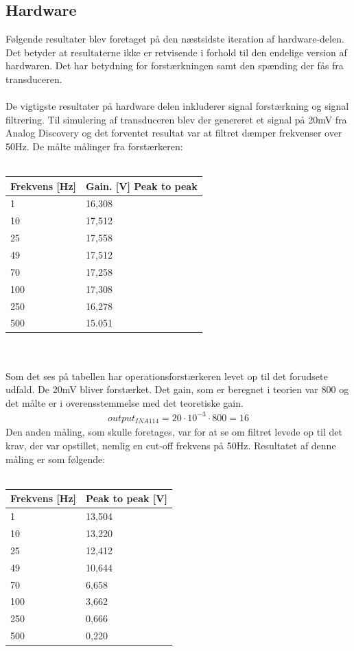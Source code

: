 \subsection{Hardware}
Følgende resultater blev foretaget på den næstsidste iteration af hardware-delen. Det betyder at resultaterne ikke er retvisende i forhold til den endelige version af hardwaren. Det har betydning for forstærkningen samt den spænding der fås fra transduceren. \\\\
De vigtigste resultater på hardware delen inkluderer signal forstærkning og signal filtrering. Til simulering af transduceren blev der genereret et signal på 20mV fra Analog Discovery og det forventet resultat var at filtret dæmper frekvenser over 50Hz. De målte målinger fra forstærkeren: 
\\\\
\begin{tabular}{| l | l |} \hline
\textbf{Frekvens [Hz]} & \textbf{Gain. [V] Peak to peak}\\\hline
1 & 16,308 \\\hline 
10 & 17,512 \\\hline
25 & 17,558 \\\hline 
49 & 17,512\\\hline
70 & 17,258\\\hline 
100 & 17,308 \\\hline
250 & 16,278\\\hline
500 & 15.051\\\hline
\end{tabular}\\\\
Som det ses på tabellen har operationsforstærkeren levet op til det forudsete udfald. De 20mV bliver forstærket. Det gain, som er beregnet i teorien var 800 og det målte er i overensstemmelse med det teoretiske gain.  
\begin{align}
output_{INA114}=20\cdot 10^{-3}\cdot 800=16
\end{align}
Den anden måling, som skulle foretages, var for at se om filtret levede op til det krav, der var opstillet, nemlig en cut-off frekvens på 50Hz. Resultatet af denne måling er som følgende:   \\\\
\begin{tabular}{| l | l |} \hline
\textbf{Frekvens [Hz]} & \textbf{Peak to peak [V]}\\\hline
1 & 13,504 \\\hline 
10 & 13,220 \\\hline
25 & 12,412 \\\hline 
49 & 10,644\\\hline
70 & 6,658 \\\hline 
100 & 3,662 \\\hline
250 & 0,666\\\hline
500 & 0,220\\\hline
\end{tabular}\\\\
